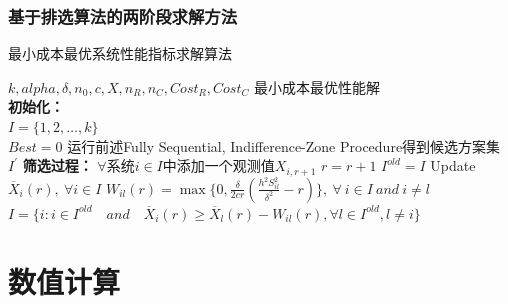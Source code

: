 \documentclass{article}
\begin{document}
\subsubsection{基于排选算法的两阶段求解方法}
\begin{algorithm}  
    \caption{最小成本最优系统性能指标求解算法}  
    \begin{algorithmic}[1] %
        \Require $k, alpha, \delta, n_0, c, X, n_R, n_C, Cost_R, Cost_C$ 
        \Ensure 最小成本最优性能解\\
        \textbf{初始化：}\\
            $I = \{ 1,2, \dots, k\}$ \\
            $Best = 0$
        \State 运行前述Fully Sequential, Indifference-Zone Procedure得到候选方案集 $I ^{'}$
        \State
        \textbf{筛选过程：}
                \State $\forall$系统$i \in I$中添加一个观测值$X_{i, r+1}$
                \State $r = r+1$
                    \State {}  
                \Else  
                    \State $ I^{old} = I $
                    \State Update $ \overline{X} _i (r), \  \forall i \in I$
                    \State $W _{il} (r) = \max \{ 0, \frac{\delta}{2cr} (\frac{h^2 S ^2 _{il}}{\delta ^2} - r)\}, \  \forall \ i \in I \  and \  i \neq l $
                    \State $ I = \{i : i \in I^{old} \quad and \quad \overline{X} _i (r) \geq \overline{X} _l (r) - W_{il} (r), \forall l \in I^{old}, l \neq i\} $
                \EndIf  
            \EndWhile  
            \State {}
    \end{algorithmic}  
\end{algorithm}  

\section{数值计算}
\end{document}
